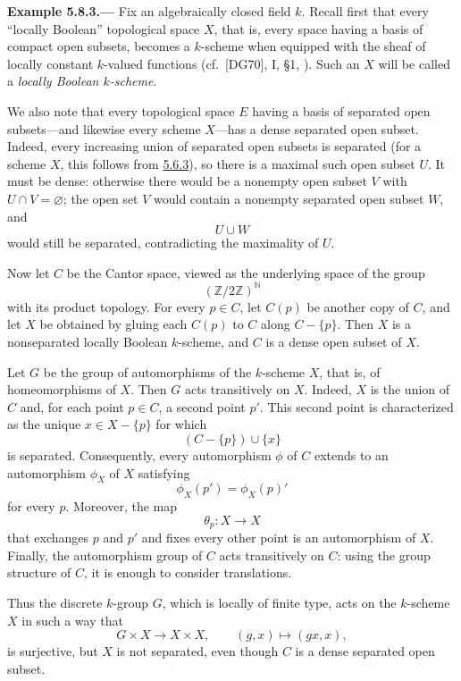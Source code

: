
\medskip
{}\label{ex:sga3-VIB-5.8.3}%
\noindent\textbf{Example 5.8.3.---}
Fix an algebraically closed field \(k\). Recall first that every
``locally Boolean'' topological space \(X\), that is, every space
having a basis of compact open subsets, becomes a \(k\)-scheme
when equipped with the sheaf of locally constant \(k\)-valued
functions (cf.\ [DG70], I, \S1, ). Such an \(X\) will be
called a \emph{locally Boolean \(k\)-scheme}.

We also note that every topological space \(E\) having a basis of
separated open subsets---and likewise every scheme \(X\)---has a
dense separated open subset. Indeed, every increasing union of
separated open subsets is separated (for a scheme \(X\), this
follows from \hyperref[lem:sga3-VIB-5.6.3]{5.6.3}), so there is a maximal such open subset \(U\).
It must be dense: otherwise there would be a nonempty open subset
\(V\) with \(U\cap V=\varnothing\); the open set \(V\) would
contain a nonempty separated open subset \(W\), and
\[
  U\cup W
\]
would still be separated, contradicting the maximality of \(U\).

Now let \(C\) be the Cantor space, viewed as the underlying space
of the group
\[
  (\mathbb Z/2\mathbb Z)^{\mathbb N}
\]
with its product topology. For every \(p\in C\), let \(C(p)\) be
another copy of \(C\), and let \(X\) be obtained by gluing each
\(C(p)\) to \(C\) along \(C-\{p\}\). Then \(X\) is a
nonseparated locally Boolean \(k\)-scheme, and \(C\) is a dense
open subset of \(X\).

Let \(G\) be the group of automorphisms of the \(k\)-scheme \(X\),
that is, of homeomorphisms of \(X\). Then \(G\) acts transitively
on \(X\). Indeed, \(X\) is the union of \(C\) and, for each point
\(p\in C\), a second point \(p'\). This second point is
characterized as the unique \(x\in X-\{p\}\) for which
\[
  (C-\{p\})\cup\{x\}
\]
is separated. Consequently, every automorphism \(\phi\) of \(C\)
extends to an automorphism \(\phi_X\) of \(X\) satisfying
\[
  \phi_X(p')=\phi_X(p)'
\]
for every \(p\). Moreover, the map
\[
  \theta_p:X\longrightarrow X
\]
that exchanges \(p\) and \(p'\) and fixes every other point is an
automorphism of \(X\). Finally, the automorphism group of \(C\)
acts transitively on \(C\): using the group structure of \(C\),
it is enough to consider translations.

Thus the discrete \(k\)-group \(G\), which is locally of finite
type, acts on the \(k\)-scheme \(X\) in such a way that
\[
  G\times X\longrightarrow X\times X,
  \qquad (g,x)\longmapsto(gx,x),
\]
is surjective, but \(X\) is not separated, even though \(C\) is a
dense separated open subset.
